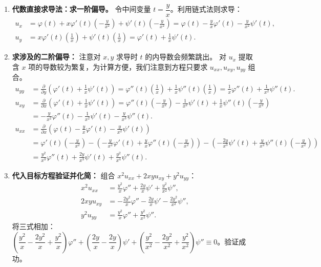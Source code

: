 \documentclass[lang=cn,11pt]{elegantbook}
\begin{document}
\begin{solution}
\begin{enumerate}
  \item \textbf{代数直接求导法：求一阶偏导。}
  令中间变量 $t=\dfrac{y}{x}$。利用链式法则求导：
  \begin{align*}
  u_x &= \varphi(t) + x\varphi'(t)\left(-\frac{y}{x^2}\right) + \psi'(t)\left(-\frac{y}{x^2}\right) = \varphi(t) - \frac{y}{x}\varphi'(t) - \frac{y}{x^2}\psi'(t), \\
  u_y &= x\varphi'(t)\left(\frac{1}{x}\right) + \psi'(t)\left(\frac{1}{x}\right) = \varphi'(t) + \frac{1}{x}\psi'(t).
  \end{align*}

  \item \textbf{求涉及的二阶偏导：}
  注意对 $x, y$ 求导时 $t$ 的内导数会频繁跳出。
  对 $u_x$ 提取含 $x$ 项的导数较为繁复，为计算方便，我们注意到方程只要求 $u_{xx}, u_{xy}, u_{yy}$ 组合。
  \begin{align*}
  u_{yy} &= \frac{\partial}{\partial y}\left(\varphi'(t) + \frac{1}{x}\psi'(t)\right) = \varphi''(t)\left(\frac{1}{x}\right) + \frac{1}{x}\psi''(t)\left(\frac{1}{x}\right) = \frac{1}{x}\varphi''(t) + \frac{1}{x^2}\psi''(t). \\
  u_{xy} &= \frac{\partial}{\partial x}\left(\varphi'(t) + \frac{1}{x}\psi'(t)\right) = \varphi''(t)\left(-\frac{y}{x^2}\right) - \frac{1}{x^2}\psi'(t) + \frac{1}{x}\psi''(t)\left(-\frac{y}{x^2}\right) \\
  &= -\frac{y}{x^2}\varphi''(t) - \frac{1}{x^2}\psi'(t) - \frac{y}{x^3}\psi''(t). \\
  u_{xx} &= \frac{\partial}{\partial x}\left(\varphi(t) - \frac{y}{x}\varphi'(t) - \frac{y}{x^2}\psi'(t)\right) \\
  &= \varphi'(t)\left(-\frac{y}{x^2}\right) - \left(-\frac{y}{x^2}\varphi'(t) + \frac{y}{x}\varphi''(t)\left(-\frac{y}{x^2}\right)\right) - \left(-\frac{2y}{x^3}\psi'(t) + \frac{y}{x^2}\psi''(t)\left(-\frac{y}{x^2}\right)\right) \\
  &= \frac{y^2}{x^3}\varphi''(t) + \frac{2y}{x^3}\psi'(t) + \frac{y^2}{x^4}\psi''(t).
  \end{align*}

  \item \textbf{代入目标方程验证并化简：}
  组合 $x^2 u_{xx} + 2xy u_{xy} + y^2 u_{yy}$：
  \begin{align*}
  x^2 u_{xx} &= \frac{y^2}{x}\varphi'' + \frac{2y}{x}\psi' + \frac{y^2}{x^2}\psi'', \\
  2xy u_{xy} &= -\frac{2y^2}{x}\varphi'' - \frac{2y}{x}\psi' - \frac{2y^2}{x^2}\psi'', \\
  y^2 u_{yy} &= \frac{y^2}{x}\varphi'' + \frac{y^2}{x^2}\psi''.
  \end{align*}
  将三式相加：$\left(\dfrac{y^2}{x} - \dfrac{2y^2}{x} + \dfrac{y^2}{x}\right)\varphi'' + \left(\dfrac{2y}{x} - \dfrac{2y}{x}\right)\psi' + \left(\dfrac{y^2}{x^2} - \dfrac{2y^2}{x^2} + \dfrac{y^2}{x^2}\right)\psi'' \equiv 0$。验证成功。
\end{enumerate}
\end{solution}
\end{document}
